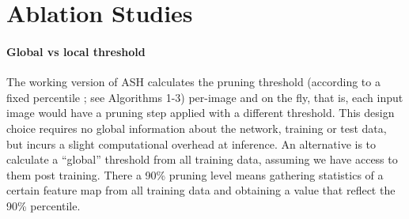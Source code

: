 \documentclass{article}
\newcommand{\seclabel}[1]{\label{sec:#1}}
\newcommand{\tablabel}[1]{\label{tab:#1}}
\begin{document}
\begin{SCtable}
\centering
{}
\caption{\textbf{An extreme variant of ASH: randomized activations}. ASH-RAND sets un-pruned activations to random values between 0 and 10. All experiments are on ImageNet with ResNet-50, and the OOD performance is averaged across 4 datasets.
ASH-RAND is surprisingly comparable to, although not better than, ASH-B and ASH-S. It consistently beats simple baselines like Energy, Softmax and ODIN.
} 
\tablabel{rand}
\end{SCtable}

\section{Ablation Studies}
\seclabel{discuss}



\paragraph{Global vs local threshold} The working version of ASH calculates the pruning threshold  (according to a fixed percentile ; see Algorithms 1-3) per-image and on the fly, that is, each input image would have a pruning step applied with a different threshold. This design choice requires no global information about the network, training or test data, but incurs a slight computational overhead at inference. An alternative is to calculate a ``global'' threshold from all training data, assuming we have access to them post training. There a 90\% pruning level means gathering statistics of a certain feature map from all training data and obtaining a value that reflect the 90\% percentile.
\end{document}
